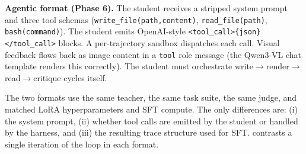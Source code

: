 \documentclass[11pt]{article}
\begin{document}
\textbf{Agentic format (Phase 6).} The student receives a stripped system prompt and three tool schemas (\texttt{write\_file(path,content)}, \texttt{read\_file(path)}, \texttt{bash(command)}). The student emits OpenAI-style \texttt{<tool\_call>\{json\}</tool\_call>} blocks. A per-trajectory sandbox dispatches each call. Visual feedback flows back as image content in a \texttt{tool} role message (the Qwen3-VL chat template renders this correctly). The student must orchestrate write$\to$render$\to$read$\to$critique cycles itself.

The two formats use the same teacher, the same task suite, the same judge, and matched LoRA hyperparameters and SFT compute. The only differences are: (i) the system prompt, (ii) whether tool calls are emitted by the student or handled by the harness, and (iii) the resulting trace structure used for SFT.  contrasts a single iteration of the loop in each format.
\end{document}
